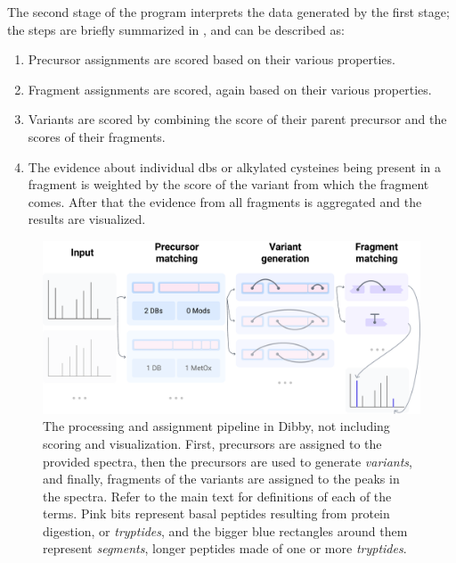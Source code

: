 The second stage of the program interprets the data generated by the first stage; the steps are briefly summarized in , and can be described as:

\begin{enumerate}
  \item Precursor assignments are scored based on their various properties.
  \item Fragment assignments are scored, again based on their various properties.
  \item Variants are scored by combining the score of their parent precursor and the scores of their fragments.
  \item The evidence about individual \glspl*{db} or alkylated cysteines being present in a fragment is weighted by the score of the variant from which the fragment comes. After that the evidence from all fragments is aggregated and the results are visualized.
\end{enumerate}


\begin{figure}[hb]
  \centering
  \includegraphics[width=\linewidth]{img/pipeline.pdf}
  \caption{The processing and assignment pipeline in Dibby, not including scoring and visualization. First, precursors are assigned to the provided spectra, then the precursors are used to generate \emph{variants}, and finally, fragments of the variants are assigned to the peaks in the spectra. Refer to the main text for definitions of each of the terms. Pink bits represent basal peptides resulting from protein digestion, or \emph{tryptides}, and the bigger blue rectangles around them represent \emph{segments}, longer peptides made of one or more \emph{tryptides}.}\label{fig:pipeline}

\end{figure}


